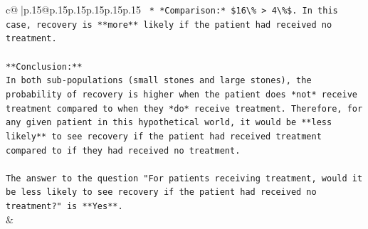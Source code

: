 \documentclass{article}
\begin{document}
{\begin{supertabular}{c@{$\;$}|p{.15\linewidth}@{}p{.15\linewidth}p{.15\linewidth}p{.15\linewidth}p{.15\linewidth}p{.15\linewidth}}
{{{\texttt{    *   *Comparison:* \$16\textbackslash{}\% > 4\textbackslash{}\%\$. In this case, recovery is **more** likely if the patient had received no treatment.} \\
\\ 
\texttt{**Conclusion:**} \\
\texttt{In both sub{-}populations (small stones and large stones), the probability of recovery is higher when the patient does *not* receive treatment compared to when they *do* receive treatment. Therefore, for any given patient in this hypothetical world, it would be **less likely** to see recovery if the patient had received treatment compared to if they had received no treatment.} \\
\\ 
\texttt{The answer to the question "For patients receiving treatment, would it be less likely to see recovery if the patient had received no treatment?" is **Yes**.} \\
            }
        }
    }
    & \\ \\


\end{supertabular}}
\end{document}
